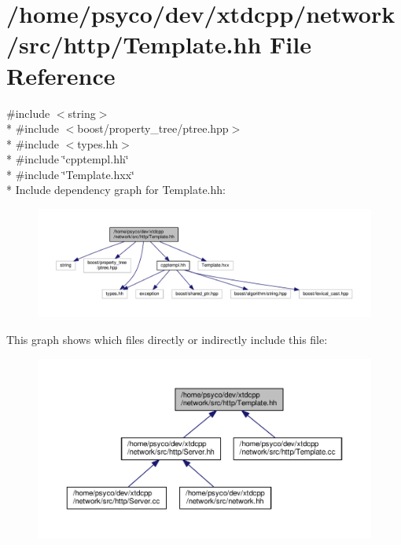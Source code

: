 \hypertarget{Template_8hh}{}\section{/home/psyco/dev/xtdcpp/network/src/http/\+Template.hh File Reference}
\label{Template_8hh}
{\ttfamily \#include $<$string$>$}\\*
{\ttfamily \#include $<$boost/property\+\_\+tree/ptree.\+hpp$>$}\\*
{\ttfamily \#include $<$types.\+hh$>$}\\*
{\ttfamily \#include \char`\"{}cpptempl.\+hh\char`\"{}}\\*
{\ttfamily \#include \char`\"{}Template.\+hxx\char`\"{}}\\*
Include dependency graph for Template.\+hh\+:
\nopagebreak
\begin{figure}[H]
\begin{center}
\leavevmode
\includegraphics[width=350pt]{Template_8hh__incl}
\end{center}
\end{figure}
This graph shows which files directly or indirectly include this file\+:
\nopagebreak
\begin{figure}[H]
\begin{center}
\leavevmode
\includegraphics[width=350pt]{Template_8hh__dep__incl}
\end{center}
\end{figure}
